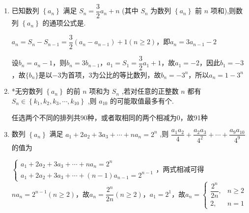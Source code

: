 \begin{enumerate}
\begin{jieda}
        $b_n = \left\lbrack  \dfrac{{\left( n + 1\right) }}{n}\right\rbrack = \left\{\begin{array}{ll}
             2, & n = 1  \\
             1, & n \geq 2
        \end{array}\right.$
    \end{jieda}
    \item 已知数列 $\left\{  {a}_{n}\right\}$ 满足 ${S}_{n} = \dfrac{3}{2}{a}_{n} + n$ (其中 ${S}_{n}$ 为数列 $\left\{  {a}_{n}\right\}$ 前 $n$ 项和),则数列 $\left\{  {a}_{n}\right\}$ 的通项公式是.
    \begin{jieda}
        $a_n = S_n - S_{n-1} = \dfrac{3}{2}({a}_{n}-{a}_{n-1}) + 1 (n \geq 2)$，即$a_n = 3a_{n-1}-2$

        设$b_n = a_n - 1$，则$b_n = 3b_{n-1}$，$a_1 = S_1 = \dfrac{3}{2}a_1 + 1$，故$a_1 = -2$，因此$b_1 = -3$，故$\{b_n\}$是以$-3$为首项，$3$为公比的等比数列，故$b_n = -3^n$，所以$a_n = 1-3^n$
    \end{jieda}
    \item *无穷数列 $\left\{  {a}_{n}\right\}$ 的前 $n$ 项和为 ${S}_{n}$ ,若对任意的正整数 $n$ 都有 ${S}_{n} \in  \left\{  {{k}_{1},{k}_{2},{k}_{3},\cdots ,{k}_{10}}\right\}$ ,则 ${a}_{10}$ 的可能取值最多有个.
    \begin{jieda}
        任选两个不同的排列共90种，或者取相同的两个相减为0，故91种
    \end{jieda}
    \item 数列 $\left\{  {a}_{n}\right\}$ 满足 ${a}_{1} + 2{a}_{2} + 3{a}_{3} + \cdots  + n{a}_{n} = {2}^{n}$ ,则 $\dfrac{{a}_{1}{a}_{2}}{4} + \dfrac{{a}_{2}{a}_{3}}{{4}^{2}} + \cdots  + \dfrac{{a}_{9}{a}_{10}}{{4}^{9}}$ 的值为
    \begin{jieda}
        $\left\{\begin{array}{l}
             {a}_{1} + 2{a}_{2} + 3{a}_{3} + \cdots  + n{a}_{n} = {2}^{n}  \\
             {a}_{1} + 2{a}_{2} + 3{a}_{3} + \cdots  + (n-1){a}_{n-1} = {2}^{n-1} 
        \end{array}\right.$，两式相减可得$na_n = 2^{n-1}(n \geq 2)$，故$a_n = \dfrac{2^n}{2n} (n \geq 2)$，$a_1 = 2^1$，故$a_n = \left\{\begin{array}{ll}
            \dfrac{2^n}{2n}, & n \geq 2  \\
            2, & n = 1
        \end{array}\right.$


\end{jieda}
\end{enumerate}
